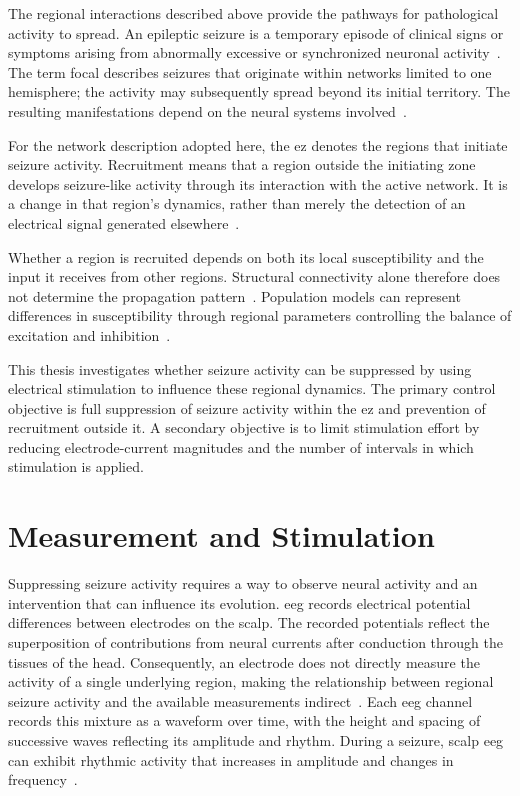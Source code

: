 The regional interactions described above provide the pathways for pathological activity to spread.
An epileptic seizure is a temporary episode of clinical signs or symptoms arising from abnormally excessive or synchronized neuronal activity~\cite{Fisher2005}.
The term focal describes seizures that originate within networks limited to one hemisphere; the activity may subsequently spread beyond its initial territory.
The resulting manifestations depend on the neural systems involved~\cite{Fisher2017}.

For the network description adopted here, the \ac{ez} denotes the regions that initiate seizure activity.
Recruitment means that a region outside the initiating zone develops seizure-like activity through its interaction with the active network.
It is a change in that region's dynamics, rather than merely the detection of an electrical signal generated elsewhere~\cite{Olmi2019}.

Whether a region is recruited depends on both its local susceptibility and the input it receives from other regions.
Structural connectivity alone therefore does not determine the propagation pattern~\cite{Olmi2019}.
Population models can represent differences in susceptibility through regional parameters controlling the balance of excitation and inhibition~\cite{Wendling2002,Yu2024}.

This thesis investigates whether seizure activity can be suppressed by using electrical stimulation to influence these regional dynamics.
The primary control objective is full suppression of seizure activity within the \ac{ez} and prevention of recruitment outside it.
A secondary objective is to limit stimulation effort by reducing electrode-current magnitudes and the number of intervals in which stimulation is applied.

\section{Measurement and Stimulation}\label{sec:measurement_intervention_background}

Suppressing seizure activity requires a way to observe neural activity and an intervention that can influence its evolution.
\Ac{eeg} records electrical potential differences between electrodes on the scalp.
The recorded potentials reflect the superposition of contributions from neural currents after conduction through the tissues of the head.
Consequently, an electrode does not directly measure the activity of a single underlying region, making the relationship between regional seizure activity and the available measurements indirect~\cite{Buzsaki2012}.
Each \ac{eeg} channel records this mixture as a waveform over time, with the height and spacing of successive waves reflecting its amplitude and rhythm.
During a seizure, scalp \ac{eeg} can exhibit rhythmic activity that increases in amplitude and changes in frequency~\cite{Stamoulis2012}.

